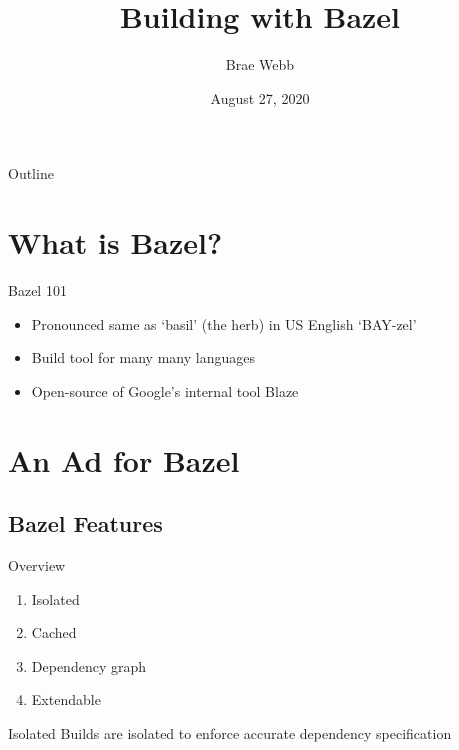 \documentclass[aspectratio=169]{beamer}
\title{Building with Bazel}
\author{Brae Webb}
\institute{University of Queensland}
\date{August 27, 2020}
\begin{document}

\begin{title-slide}
\titlepage
\end{title-slide}

\begin{split-slide}{Outline}
    \vspace{4em}
    \tableofcontents
\end{split-slide}

\section{What is Bazel?}

\begin{body-slide}{Bazel 101}
\begin{itemize}[<+-|alert@+>]
    \color{UQCSBlue}
    \item Pronounced same as `basil' (the herb) in US English `BAY-zel'
    \item Build tool for many many languages
    \item Open-source of Google's internal tool Blaze
\end{itemize}

\end{body-slide}

\section{An Ad for Bazel}

\subsection{Bazel Features}
\begin{split-slide}{Overview}
\begin{enumerate}
    \item Isolated
    \item Cached
    \item Dependency graph
    \item Extendable
\end{enumerate}
\end{split-slide}

\begin{body-slide}{Isolated}
Builds are isolated to enforce accurate dependency specification
\end{body-slide}
\end{document}
